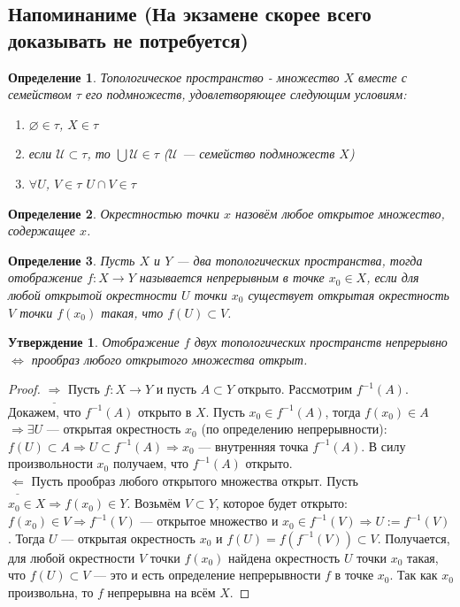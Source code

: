 \documentclass[12pt]{article}
\theoremstyle{plain}
\newtheorem{subtheorem}{Утверждение}[section]
\newtheorem{definition}{Определение}[section]
\begin{document}
    \subsection{Напоминаниме (На экзамене скорее всего доказывать не потребуется)}
    \begin{definition}
        Топологическое пространство - множество $X$ вместе с семейством $\tau$ его подмножеств, удовлетворяющее следующим условиям:\begin{enumerate}
            \item $\varnothing\in\tau$, $X\in\tau$
            \item если $\mathcal{U}\subset\tau$, то $\bigcup\mathcal{U}\in\tau$ ($\mathcal{U}$ --- семейство подмножеств $X$)
            \item $\forall U$, $V\in\tau$ $U\cap V\in\tau$
        \end{enumerate}
    \end{definition}
    \begin{definition}
        Окрестностью точки $x$ назовём любое открытое множество, содержащее $x$.
    \end{definition}
    \begin{definition}
        Пусть $X$ и $Y$ --- два топологических пространства, тогда отображение $f:X\to Y$ называется непрерывным в точке $x_0\in X$, если для любой открытой окрестности $U$ точки $x_0$ существует открытая окрестность $V$ точки $f(x_0)$ такая, что $f(U)\subset V$.
    \end{definition}
    \begin{subtheorem}
        Отображение $f$ двух топологических пространств непрерывно $\Longleftrightarrow$ прообраз любого открытого множества открыт.
    \end{subtheorem}
    \begin{proof}
        $\underline{\Longrightarrow}$ Пусть $f: X \to Y$ и пусть $A \subset Y$ открыто. Рассмотрим $f^{-1}(A)$. Докажем, что $f^{-1}(A)$ открыто в $X$. Пусть $x_0 \in f^{-1}(A)$, тогда $f(x_0) \in A$ $\Longrightarrow \exists U$ — открытая окрестность $x_0$ (по определению непрерывности): $f(U) \subset A \Longrightarrow U \subset f^{-1}(A) \Longrightarrow x_0$ — внутренняя точка $f^{-1}(A)$. В силу произвольности $x_0$ получаем, что $f^{-1}(A)$ открыто. \\
        $\underline{\Longleftarrow}$ Пусть прообраз любого открытого множества открыт. Пусть $x_0 \in X \Longrightarrow f(x_0) \in Y$. Возьмём $V \subset Y$, которое будет открыто: $f(x_0) \in V \Longrightarrow f^{-1}(V)$ — открытое множество и $x_0 \in f^{-1}(V) \Longrightarrow U := f^{-1}(V)$. Тогда $U$  — открытая окрестность $x_0$ и $f(U) = f(f^{-1}(V)) \subset V$. Получается, для любой окрестности $V$ точки $f(x_0)$ найдена окрестность $U$ точки $x_0$ такая, что $f(U) \subset V$ — это и есть определение непрерывности $f$ в точке $x_0$. Так как $x_0$ произвольна, то $f$ непрерывна на всём $X$.
    \end{proof}
\end{document}
